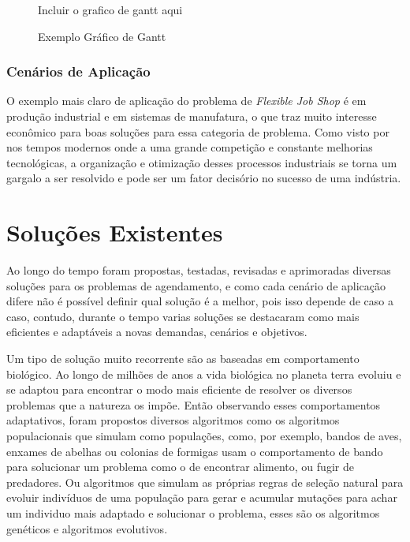             \begin{figure}[ht]
                \centering
                \small{Incluir o grafico de gantt aqui}
                \caption{Exemplo Gráfico de Gantt}
                \label{fig:plot-gantt}
            \end{figure}
        


        \subsubsection{Cenários de Aplicação}
            O exemplo mais claro de aplicação do problema de \textit{Flexible Job Shop} é em produção industrial e em sistemas de manufatura, o que traz muito interesse econômico para boas soluções para essa categoria de problema.\newline
            Como visto por \cite{Wari2016} nos tempos modernos onde a uma grande competição e constante melhorias tecnológicas, a organização e otimização desses processos industriais se torna um gargalo a ser resolvido e pode ser um fator decisório no sucesso de uma indústria.
        
    


\section{Soluções Existentes}
        Ao longo do tempo foram propostas, testadas, revisadas e aprimoradas diversas soluções para os problemas de agendamento, e como cada cenário de aplicação difere não é possível definir qual solução é a melhor, pois isso depende de caso a caso, contudo, durante o tempo varias soluções se destacaram como mais eficientes e adaptáveis a novas demandas, cenários e objetivos.\hfill\vspace{\onelineskip}
        
        Um tipo de solução muito recorrente são as baseadas em comportamento biológico. Ao longo de milhões de anos a vida biológica no planeta terra evoluiu e se adaptou para encontrar o modo mais eficiente de resolver os diversos problemas que a natureza os impõe. Então observando esses comportamentos adaptativos, foram propostos diversos algoritmos como os algoritmos populacionais que simulam como populações, como, por exemplo, bandos de aves, enxames de abelhas ou colonias de formigas usam o comportamento de bando para solucionar um problema como o de encontrar alimento, ou fugir de predadores. Ou algoritmos que simulam as próprias regras de seleção natural para evoluir indivíduos de uma população para gerar e acumular mutações para achar um individuo mais adaptado e solucionar o problema, esses são os algoritmos genéticos e algoritmos evolutivos.


